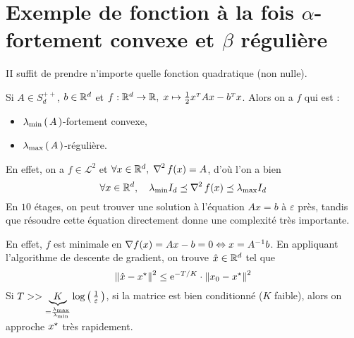 \section{Exemple de fonction à la fois $\alpha$-fortement convexe et
 $\beta$ régulière}

 II suffit de prendre n'importe quelle fonction quadratique (non nulle).

 Si $A \in S_d^{++}$, $b \in \mathbb{R}^d$ et $f: \mathbb{R}^d \rightarrow \mathbb{R}, \; x \mapsto \frac{1}{2} x^{\scriptscriptstyle T}Ax-b^{\scriptscriptstyle T}x$.
 Alors on a $f$ qui est :
 \begin{itemize}
   \item $\lambda_{\min}\left( \, A \, \right)$-fortement convexe,
   \item $\lambda_{\max}\left( \, A \, \right)$-régulière.
 \end{itemize}

 En effet, on a $f \in \mathcal{L}^2$ et $ \forall x \in \mathbb{R}^d, \; \operatorname{\nabla\!}^{\,2}f(x) = A$,
 d'où l'on a bien
 \begin{equation*}
   \forall x \in \mathbb{R}^d, \quad \lambda_{\min} I_d \preceq  \operatorname{\nabla\!}^{\,2}f(x) \preceq
   \lambda_{\max} I_d
 \end{equation*}
 En $10$ étages, on peut trouver une solution à l'équation $Ax= b$ à $\varepsilon$
 près, tandis que résoudre cette équation directement donne une complexité très importante.

 En effet, $f$ est minimale en $\operatorname{\nabla\!} f(x) = Ax-b = 0 \Leftrightarrow x=A^{-1}b$.
 En appliquant l'algorithme de descente de gradient, on trouve $\hat{x} \in \mathbb{R}^d$ tel que
 \begin{equation*}
\norme{\xhat - \xopt}^2 \leq \e^{-T/K}\cdot \norme{x_0-\xopt}^2
 \end{equation*}
 Si $T >> \underbrace{K}_{= \frac{\lambda_{\max}}{\lambda_{\min}}} \log \left( \, \frac{1}{\varepsilon} \, \right) $, \eg si la matrice est bien conditionné ($K$ faible),
  alors on approche $\xopt$ très rapidement.

